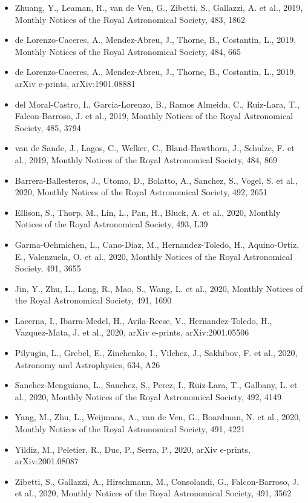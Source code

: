 \documentclass{letter}
\begin{document}
\begin{enumerate}
\begin{itemize}
\item Zhuang, Y., Leaman, R., van de Ven, G., Zibetti, S., Gallazzi, A. et al., 2019, Monthly Notices of the Royal Astronomical Society, 483, 1862
\item de Lorenzo-Caceres, A., Mendez-Abreu, J., Thorne, B., Costantin, L., 2019, Monthly Notices of the Royal Astronomical Society, 484, 665
\item de Lorenzo-Caceres, A., Mendez-Abreu, J., Thorne, B., Costantin, L., 2019, arXiv e-prints, arXiv:1901.08881
\item del Moral-Castro, I., Garcia-Lorenzo, B., Ramos Almeida, C., Ruiz-Lara, T., Falcon-Barroso, J. et al., 2019, Monthly Notices of the Royal Astronomical Society, 485, 3794
\item van de Sande, J., Lagos, C., Welker, C., Bland-Hawthorn, J., Schulze, F. et al., 2019, Monthly Notices of the Royal Astronomical Society, 484, 869
\item Barrera-Ballesteros, J., Utomo, D., Bolatto, A., Sanchez, S., Vogel, S. et al., 2020, Monthly Notices of the Royal Astronomical Society, 492, 2651
\item Ellison, S., Thorp, M., Lin, L., Pan, H., Bluck, A. et al., 2020, Monthly Notices of the Royal Astronomical Society, 493, L39
\item Garma-Oehmichen, L., Cano-Diaz, M., Hernandez-Toledo, H., Aquino-Ortiz, E., Valenzuela, O. et al., 2020, Monthly Notices of the Royal Astronomical Society, 491, 3655
\item Jin, Y., Zhu, L., Long, R., Mao, S., Wang, L. et al., 2020, Monthly Notices of the Royal Astronomical Society, 491, 1690
\item Lacerna, I., Ibarra-Medel, H., Avila-Reese, V., Hernandez-Toledo, H., Vazquez-Mata, J. et al., 2020, arXiv e-prints, arXiv:2001.05506
\item Pilyugin, L., Grebel, E., Zinchenko, I., Vilchez, J., Sakhibov, F. et al., 2020, Astronomy and Astrophysics, 634, A26
\item Sanchez-Menguiano, L., Sanchez, S., Perez, I., Ruiz-Lara, T., Galbany, L. et al., 2020, Monthly Notices of the Royal Astronomical Society, 492, 4149
\item Yang, M., Zhu, L., Weijmans, A., van de Ven, G., Boardman, N. et al., 2020, Monthly Notices of the Royal Astronomical Society, 491, 4221
\item Yildiz, M., Peletier, R., Duc, P., Serra, P., 2020, arXiv e-prints, arXiv:2001.08087
\item Zibetti, S., Gallazzi, A., Hirschmann, M., Consolandi, G., Falcon-Barroso, J. et al., 2020, Monthly Notices of the Royal Astronomical Society, 491, 3562

\end{itemize}
\end{enumerate}
\end{document}
